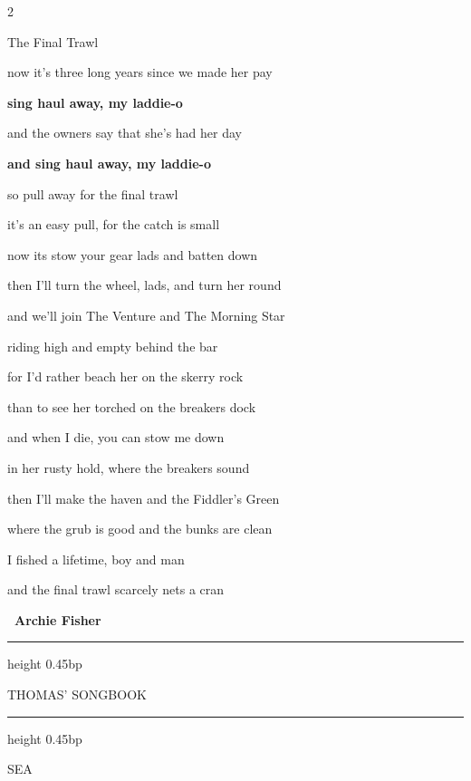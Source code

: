 \documentclass[10pt,twoside]{article}
\newlength{\songcolumnwidth}
\newcommand{\songbooktitle}{Thomas' Songbook}
\newcommand{\categorylabel}[1]{%
  {\categoryface\fontsize{17bp}{19bp}\selectfont\MakeUppercase{#1}}%
}
\newcommand{\category}[1]{%
  \par\noindent
  \parbox[c]{\songcolumnwidth}{%
    \centering
    \hrule height 0.45bp\vskip 2.5bp
    {\mastheadface\fontsize{10bp}{11bp}\selectfont\MakeUppercase{\songbooktitle}\par}%
    \vskip 2bp\hrule height 0.45bp
  }%
  \hfill
  \categorylabel{#1}%
  \par\vspace{11bp}%
}
\newcommand{\songtext}{\raggedright\fontsize{9bp}{9.15bp}\selectfont}
\newenvironment{songcolumns}
  {\begin{multicols*}{2}\songtext}
  {\end{multicols*}}
\newcommand{\songtitle}[1]{%
  \par\addvspace{9bp}%
  {\titleface\fontsize{14.5bp}{15bp}\selectfont #1\par}%
  \nobreak\vskip 2bp%
}
\newcommand{\lyric}[1]{%
  \hangindent=9bp\relax
  #1\par
}
\newenvironment{stanza}{\par\begingroup}{\par\endgroup\addvspace{4bp}}
\newcommand{\refrain}[1]{\lyric{\textbf{#1}}}
\newcommand{\linechords}[1]{%
  \par\nobreak\vskip 2bp
  {\chordface\fontsize{9bp}{10bp}\selectfont\formatchords{#1}\par}%
  \addvspace{4bp}%
}
\newcommand{\songcredit}[1]{%
  \par\nobreak\noindent\hspace*{9bp}%
  {\sffamily\bfseries\fontsize{7bp}{8bp}\selectfont\textemdash\ #1\par}%
}
\begin{document}
\begin{songcolumns}
\songtitle{The Final Trawl}
\begin{stanza}
  \lyric{now it's three long years since we made her pay}
  \refrain{sing haul away, my laddie-o}
  \lyric{and the owners say that she's had her day}
  \refrain{and sing haul away, my laddie-o}
  \linechords{\mbox{C F /} \mbox{Am Em /} \mbox{C F /} \mbox{Dm G}}
\end{stanza}
\begin{stanza}
  \lyric{so pull away for the final trawl}
  \lyric{it's an easy pull, for the catch is small}
\end{stanza}
\begin{stanza}
  \lyric{now its stow your gear lads and batten down}
  \lyric{then I'll turn the wheel, lads, and turn her round}
\end{stanza}
\begin{stanza}
  \lyric{and we'll join \textquotedbl{}The Venture\textquotedbl{} and \textquotedbl{}The Morning Star\textquotedbl{}}
  \lyric{riding high and empty behind the bar}
\end{stanza}
\begin{stanza}
  \lyric{for I'd rather beach her on the skerry rock}
  \lyric{than to see her torched on the breakers dock}
\end{stanza}
\begin{stanza}
  \lyric{and when I die, you can stow me down}
  \lyric{in her rusty hold, where the breakers sound}
\end{stanza}
\begin{stanza}
  \lyric{then I'll make the haven and the Fiddler's Green}
  \lyric{where the grub is good and the bunks are clean}
\end{stanza}
\begin{stanza}
  \lyric{I fished a lifetime, boy and man}
  \lyric{and the final trawl scarcely nets a cran}
\end{stanza}
\songcredit{Archie Fisher}

\end{songcolumns}

\clearpage

\category{Sea}
\end{document}
